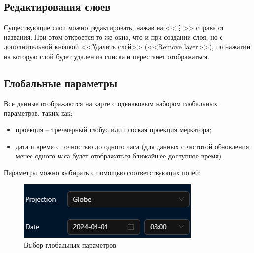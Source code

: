 \documentclass[a4paper, 12pt]{article}
\begin{document}
	\subsection{Редактирования слоев}
	Существующие слои можно редактировать, нажав на <<\vdots>> справа от названия. При этом откроется то же окно, что и
	при создании слоя, но с дополнительной кнопкой <<Удалить слой>> (<<Remove layer>>), по нажатии на которую слой будет
	удален из списка и перестанет отображаться.

	\subsection{Глобальные параметры}
	Все данные отображаются на карте с одинаковым набором глобальных параметров, таких как:
	\begin{itemize}
		\item проекция -- трехмерный глобус или плоская проекция меркатора;

		\item дата и время с точностью до одного часа (для данных с частотой обновления менее одного часа будет отображаться
			ближайшее доступное время).
	\end{itemize}
	Параметры можно выбирать с помощью соответствующих полей:
	\begin{figure}[h!]
		\centering
		\includegraphics{./assets/pic6.png}
		\caption{Выбор глобальных параметров}
	\end{figure}
\end{document}
